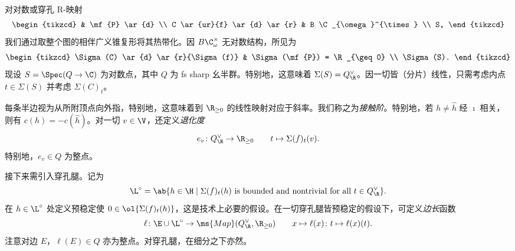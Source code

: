 \begin{exm}
\begin{center}
    \end{center}
\end{exm}

对对数或穿孔 R-映射
\begin{equation*}
\begin{tikzcd}
    & \mf{P} \ar{d} \\
    C \ar{ur}{f} \ar{d} \ar{r} & B \C_{\omega}^{\times} \\
    S,
\end{tikzcd}
\end{equation*}
我们通过取整个图的相伴广义锥复形将其热带化。因 \(B \C_{\omega}^{\times}\) 无对数结构，所见为
\begin{equation*}
\begin{tikzcd}
    \Sigma(C) \ar{d} \ar{r}{\Sigma(f)} & \Sigma(\mf{P}) = \R_{\geq 0} \\
    \Sigma(S).
\end{tikzcd}
\end{equation*}
现设 \(S = \Spec (Q \to \C)\) 为对数点，其中 \(Q\) 为 fs sharp 幺半群。特别地，这意味着 \(\Sigma(S) = Q_{\R}^{\vee}\)。因一切皆（分片）线性，只需考虑内点 \(t \in \Sigma(S)\) 并考虑 \(\Sigma(C)_t\)。

每条半边视为从所附顶点向外指，特别地，这意味着到 \(\R_{\geq 0}\) 的线性映射对应于斜率。我们称之为\textit{接触阶}。特别地，若 \(h \neq \hat{h}\) 经 \(\imath\) 相关，则有 \(c(h) = - c(\hat{h})\)。对一切 \(v \in \V\)，还定义\textit{退化度}
\[ e_v \colon Q_{\R}^{\vee} \to \R_{\geq 0} \qquad t \mapsto \Sigma(f)_t (v). \]
特别地，\(e_v \in Q\) 为整点。

接下来需引入穿孔腿。记为
\[ \L^{\circ} = \ab\{ h \in \H \mid \Sigma(f)_t(h) \text{ is bounded and nontrivial for all } t \in Q_{\R}^{\vee}\}. \]
在 \(h \in \L^{\circ}\) 处定义预稳定使 \(0 \in \ol{\Sigma(f)_t(h)}\)，这是技术上必要的假设。在一切穿孔腿皆预稳定的假设下，可定义\textit{边长}函数
\[ \ell \colon \E \cup \L^{\circ} \to \ms{Map}(Q_{\R}^{\vee}, \R_{\geq 0}) \qquad x \mapsto \ell(x) \colon t \mapsto \ell(x)(t). \]
注意对边 \(E\)，\(\ell(E) \in Q\) 亦为整点。对穿孔腿，在细分之下亦然。

